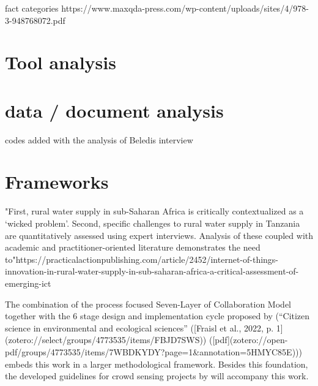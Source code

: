 fact categories
https://www.maxqda-press.com/wp-content/uploads/sites/4/978-3-948768072.pdf

\section{Tool analysis}


\section{data / document analysis}

codes added with the analysis of Beledis interview

\section{Frameworks}

"First, rural water supply in sub-Saharan Africa is critically contextualized as a ‘wicked problem’. Second, specific challenges to rural water supply in Tanzania are quantitatively assessed using expert interviews. Analysis of these coupled with academic and practitioner-oriented literature demonstrates the need to"https://practicalactionpublishing.com/article/2452/internet-of-things-innovation-in-rural-water-supply-in-sub-saharan-africa-a-critical-assessment-of-emerging-ict

The combination of the  process focused Seven-Layer of Collaboration Model together with the 6 stage design and implementation cycle proposed by \autocite[postnote]{fraislCitizenScienceEnvironmental2022} (“Citizen science in environmental and ecological sciences” ([Fraisl et al., 2022, p. 1](zotero://select/groups/4773535/items/FBJD7SWS)) ([pdf](zotero://open-pdf/groups/4773535/items/7WBDKYDY?page=1&annotation=5HMYC85E))) embeds this work in a larger methodological framework. Besides this foundation, the developed guidelines for crowd sensing projects by \autocite[postnote]{minkman} \Autocite*[test]{minkmanCitizenScienceWater2015} will accompany this work.


